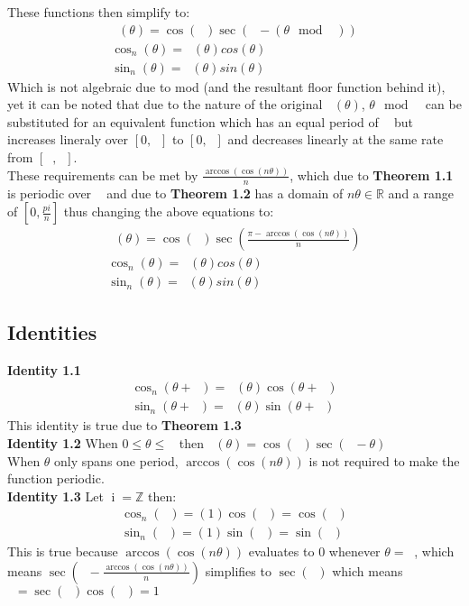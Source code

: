 \documentclass[11pt]{article}
\DeclareMathOperator{\custd}{\mathrm{d}_n}
\DeclareMathOperator{\custh}{\mathrm{h}_n}
\DeclareMathOperator{\custi}{\mathrm{i}}
\DeclareMathOperator{\period}{\frac{2\pi}{n}}
\DeclareMathOperator{\hp}{\frac{\pi}{n}}
\DeclareMathOperator{\iperiod}{\frac{2\custi\pi}{n}}
\begin{document}
These functions then simplify to:
\begin{gather*}
   		\custd(\theta)=\cos(\hp)\sec(\hp-(\theta\mod\period))\\
   		\cos_n(\theta)=\custd(\theta)cos(\theta)\\
   		\sin_n(\theta)=\custd(\theta)sin(\theta)
\end{gather*}
Which is not algebraic due to mod (and the resultant floor function behind it), yet it can be noted that due to the nature of the original \(\custh(\theta)\), \(\theta\mod\period\) can be substituted for an equivalent function which has an equal period of \(\period\) 
but increases lineraly over \([0,\period]\) to \([0,\hp]\) and decreases linearly at the same rate from \([\hp,\period]\).\\
These requirements can be met by \(\frac{\arccos(\cos(n\theta))}{n}\), which due to \textbf{Theorem 1.1} is periodic over \(\period\) and due to \textbf{Theorem 1.2} has a domain of \(n\theta\in\mathbb{R}\) and a range of \([0,\frac{pi}{n}]\) thus changing the above equations to:
\begin{gather*}
   		\custd(\theta)=\cos(\hp)\sec(\frac{\pi-\arccos(\cos(n\theta))}{n})\\
   		\cos_n(\theta)=\custd(\theta)cos(\theta)\\
   		\sin_n(\theta)=\custd(\theta)sin(\theta)
\end{gather*}

\pagebreak

\subsection{Identities}
\textbf{Identity 1.1} \begin{gather*}
	\cos_n(\theta+\period) = \custd(\theta)\cos(\theta+\period)\\
	\sin_n(\theta+\period) = \custd(\theta)\sin(\theta+\period)
\end{gather*} 
This identity is true due to \textbf{Theorem 1.3}\\
\textbf{Identity 1.2} When \(0\leq\theta\leq\period\) then \(\custd(\theta)=\cos(\hp)\sec(\hp-\theta)\)\\
When \(\theta\) only spans one period, \(\arccos(\cos(n\theta))\) is not required to make the function periodic.\\
\textbf{Identity 1.3} Let \(\custi=\mathbb{Z}\) then:
\begin{gather*}
	\cos_n(\iperiod) = (1)\cos(\iperiod)=\cos(\iperiod)\\
	\sin_n(\iperiod) = (1)\sin(\iperiod)=\sin(\iperiod)
\end{gather*} 
This is true because \(\arccos(\cos(n\theta))\) evaluates to 0 whenever \(\theta=\iperiod\), which means \(\sec(\hp-\frac{\arccos(\cos(n\theta))}{n})\) simplifies to \(\sec(\hp)\) which means \(\custd=\sec(\hp)\cos(\hp)=1\)
\end{document}
